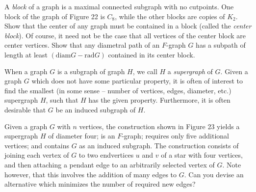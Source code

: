 \documentclass{article}
\begin{document}
\begin{description}
  A \emph{block} of a graph is a maximal connected subgraph with no cutpoints. One block of the graph of Figure 22 is $C_8$, while the other blocks are copies of $K_2$. Show that the center of any graph must be contained in a block (called the \emph{center block}). Of course, it need not be the case that all vertices of the center block are center vertices. Show that any diametral path of an $F$-graph $G$ has a subpath of length at least $(\text{diam} G - \text{rad} G)$ contained in its center block.

  When a graph $G$ is a subgraph of graph $H$, we call $H$ a \emph{supergraph} of $G$. Given a graph $G$ which does not have some particular property, it is often of interest to find the smallest (in some sense -- number of vertices, edges, diameter, etc.) supergraph $H$, such that $H$ has the given property. Furthermore, it is often desirable that $G$ be an induced subgraph of $H$.

  Given a graph $G$ with $n$ vertices, the construction shown in Figure 23 yields a supergraph $H$ of diameter four; is an $F$-graph; requires only five additional vertices; and contains $G$ as an induced subgraph. The construction consists of joining each vertex of $G$ to two endvertices $u$ and $v$ of a star with four vertices, and then attaching a pendant edge to an arbitrarily selected vertex of $G$. Note however, that this involves the addition of many edges to $G$. Can you devise an alternative which minimizes the number of required new edges?


\end{description}
\end{document}
